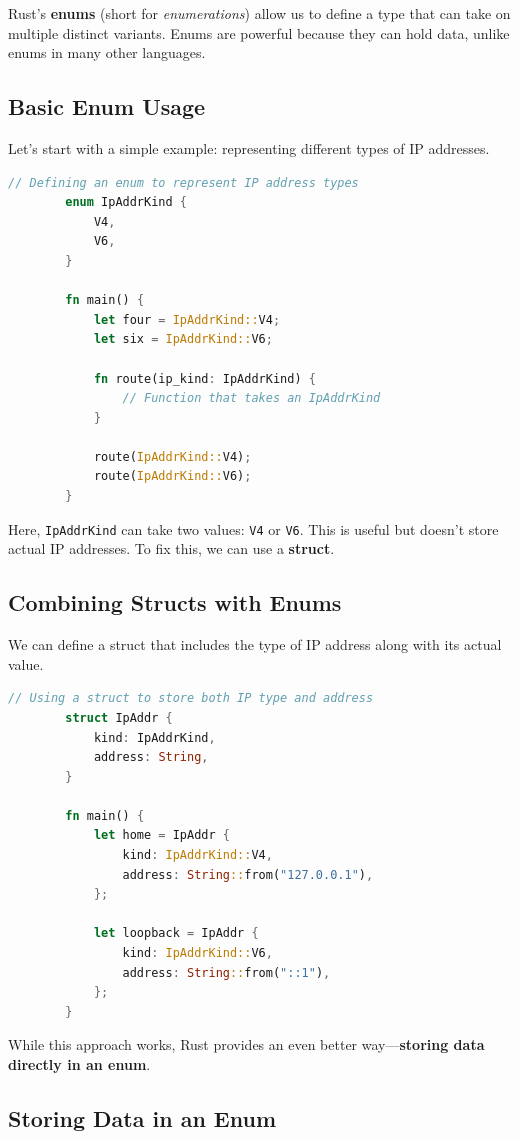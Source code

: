 \documentclass[a4paper,12pt]{report}
\begin{document}
	Rust's \textbf{enums} (short for \textit{enumerations}) allow us to define a type that can take on multiple distinct variants. Enums are powerful because they can hold data, unlike enums in many other languages.
	
	\subsection*{Basic Enum Usage}
	
	Let's start with a simple example: representing different types of IP addresses.
	
	\begin{lstlisting}[language=Rust]
		// Defining an enum to represent IP address types
		enum IpAddrKind {
			V4,
			V6,
		}
		
		fn main() {
			let four = IpAddrKind::V4;
			let six = IpAddrKind::V6;
			
			fn route(ip_kind: IpAddrKind) {
				// Function that takes an IpAddrKind
			}
			
			route(IpAddrKind::V4);
			route(IpAddrKind::V6);
		}
	\end{lstlisting}
	
	\noindent Here, \texttt{IpAddrKind} can take two values: \texttt{V4} or \texttt{V6}. This is useful but doesn't store actual IP addresses. To fix this, we can use a \textbf{struct}.
	
	\subsection*{Combining Structs with Enums}
	
	We can define a struct that includes the type of IP address along with its actual value.
	
	\begin{lstlisting}[language=Rust]
		// Using a struct to store both IP type and address
		struct IpAddr {
			kind: IpAddrKind,
			address: String,
		}
		
		fn main() {
			let home = IpAddr {
				kind: IpAddrKind::V4,
				address: String::from("127.0.0.1"),
			};
			
			let loopback = IpAddr {
				kind: IpAddrKind::V6,
				address: String::from("::1"),
			};
		}
	\end{lstlisting}
	
	\noindent While this approach works, Rust provides an even better way—\textbf{storing data directly in an enum}.
	
	\subsection*{Storing Data in an Enum}
	
\end{document}
